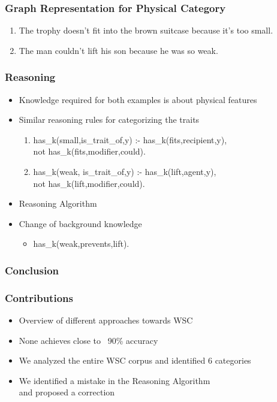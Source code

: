 \documentclass[c,8pt,xcolor...,x11names]{beamer}
\newcommand\tab[1][1cm]{\hspace*{#1}}
\begin{document}
\begin{frame}[fragile]

\frametitle{Graph Representation for Physical Category}
 \begin{enumerate}	
	\item The trophy doesn't fit into the brown suitcase because it's too small. 
	


 \item The man couldn't lift his son because he was so weak. 
 			 

\end{enumerate}
\end{frame}


\begin{frame}[fragile] \frametitle{Reasoning}

	\begin{itemize}
	\item Knowledge required for both examples is about \alert{physical features} 
	\item Similar reasoning rules for categorizing the traits
	\begin{enumerate}
		\normalsize
		\item has\_k(small,is\_trait\_of,y) :- has\_k(fits,recipient,y),\\
		\tab \tab \tab  \alert{not} has\_k(fits,modifier,could).\\
		\item has\_k(weak, is\_trait\_of,y) :- has\_k(lift,agent,y), \\ 
		\tab \tab \tab	\alert{not} has\_k(lift,modifier,could).
	\end{enumerate}
			\item Reasoning Algorithm
	\onslide<2->		\item Change of background knowledge
	\onslide<2->		\begin{itemize}
		\normalsize
		\item has\_k(weak,prevents,lift).
	\end{itemize} 
	
\end{itemize}
\end{frame}

\subsubsection{Conclusion}

\begin{frame}[fragile] \frametitle{Contributions}
  \begin{itemize}
	\normalsize
	\item Overview of different approaches towards WSC
	\item None achieves close to ~90\% accuracy 
	\item We \alert{analyzed} the entire WSC corpus and identified 6 categories
	\item We identified a mistake in the Reasoning Algorithm \\and proposed a correction    
\end{itemize}
\end{frame}
\end{document}
